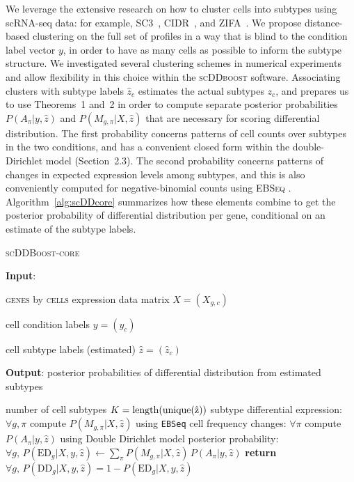 \documentclass[aoas,preprint]{imsart}
\begin{document}
We leverage the extensive research on how to cluster cells into subtypes using scRNA-seq data:
for example,  SC3~\citep{sc3}, CIDR~\citep{CIDR}, and ZIFA~\citep{ZIFA}. 
We propose distance-based clustering on the full set
of profiles in a way that is blind to the condition label vector $y$, in order to have as many cells as possible
to inform the subtype structure.  We investigated several clustering schemes in numerical experiments and allow 
flexibility in this choice within the \textsc{scDDboost} software. 
Associating clusters with subtype labels $\hat z_c$  estimates
the actual subtypes $z_c$, and prepares us to use Theorems~1 and~2 in order to compute separate
posterior probabilities $P(A_\pi|y, \hat z)$ and $P(M_{g, \pi}| X, \hat z)$ that are necessary for scoring
differential distribution. The first probability concerns patterns of cell counts over subtypes in the two conditions,
and has a convenient closed form within the double-Dirichlet model (Section~2.3).
The second probability concerns patterns of changes in expected expression levels among subtypes, and this is
also conveniently computed for negative-binomial counts using \textsc{EBSeq} \citep{ref:Leng}. 
Algorithm~\ref{alg:scDDcore}
summarizes how these elements combine to get the posterior probability of differential distribution per gene,
conditional on an estimate of the subtype labels.


\begin{algorithm}
\caption{\textsc{scDDBoost-core}}\label{alg:scDDcore}
\raggedright\hspace*{\algorithmicindent} \textbf{Input}: \begin{list}{}{}
 \item \textsc{genes} by \textsc{cells} expression data matrix $X=(X_{g,c})$
 \item  cell condition labels $y=(y_c)$ 
 \item  cell subtype labels (estimated)  $\hat z=(\hat z_c)$
 \end{list}
\hspace*{\algorithmicindent} 
\textbf{Output}:  posterior probabilities of differential distribution from estimated subtypes
\begin{algorithmic}[1]
 \item  number of cell subtypes $K = \rm{length}( \rm{unique}( \hat z ) )$  
\State subtype differential expression: $\forall g,\pi$ compute  $P(M_{g,\pi} | X, \hat z)$ using \verb+EBSeq+
\State cell frequency changes: $\forall \pi$ compute  $P(A_\pi | y, \hat z)$ using Double Dirichlet model 
\State posterior probability: $\forall g,  \, P(\text{ED}_g | X, y, \hat z)\gets \underset{\pi}{\sum}P(M_{g,\pi} | X, \hat z) \,
 P(A_\pi | y, \hat z)$
\State \textbf{return} $\forall g, \, P(\text{DD}_g |X, y, \hat z)=1-P(\text{ED}_g| X,y, \hat z)$
\EndProcedure
\end{algorithmic}
\end{algorithm}
\end{document}
